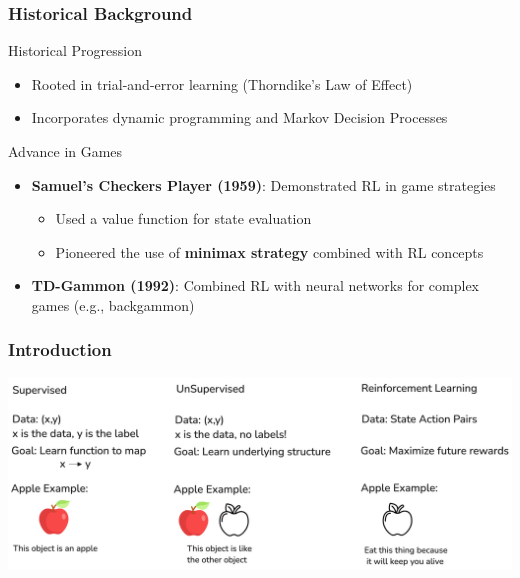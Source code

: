 \begin{frame}
	\frametitle{Historical Background}
	\vspace{0.5cm}
	Historical Progression
	\vspace{-0.2cm}
	\begin{itemize}
		\item Rooted in trial-and-error learning (Thorndike's Law of Effect)
		\item Incorporates dynamic programming and Markov Decision Processes
	\end{itemize}
	Advance in Games
	\vspace{-0.2cm}
	\begin{itemize}
		\item \textbf{Samuel's Checkers Player (1959)}: Demonstrated RL in game strategies 
				\begin{itemize}
					\item Used a value function for state evaluation
					\item Pioneered the use of \textbf{minimax strategy} combined with RL concepts
				\end{itemize}
		\item\textbf{ TD-Gammon (1992)}: Combined RL with neural networks for complex games (e.g., backgammon)
	\end{itemize}
\end{frame}

\begin{frame}
	\frametitle{Introduction}
	\vspace{1cm}
	\centering
	\includegraphics[scale=0.1]{appleNYC}
\end{frame}

